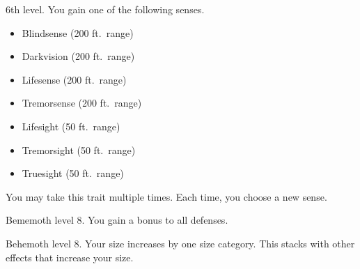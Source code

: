     \featpre 6th level.
    \featben You gain one of the following senses.
    \begin{itemize}
        \item Blindsense (200 ft.\ range)
        \item Darkvision (200 ft.\ range)
        \item Lifesense (200 ft.\ range)
        \item Tremorsense (200 ft.\ range)
        \item Lifesight (50 ft.\ range)
        \item Tremorsight (50 ft.\ range)
        \item Truesight (50 ft.\ range)
    \end{itemize}
     You may take this trait multiple times.
    Each time, you choose a new sense.

    \featpre Bememoth level 8.
    \featben You gain a  bonus to all defenses.

    \featpre Behemoth level 8.
    \featben Your size increases by one size category.
    This stacks with other effects that increase your size.
